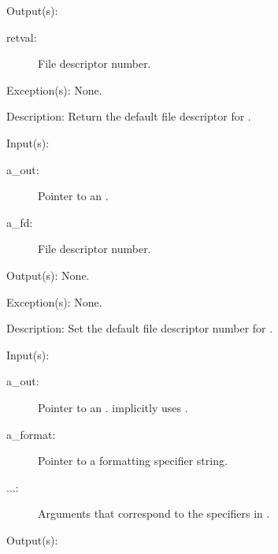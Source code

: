 \begin{capi}
\begin{capilist}
\begin{description}
		\end{description}
	\item[Output(s): ]
		\begin{description}\item[]
		\item[retval: ]
			File descriptor number.
		\end{description}
	\item[Exception(s): ] None.
	\item[Description: ]
		Return the default file descriptor for .
	\end{capilist}
\label{out_default_fd_set}
	\begin{capilist}
	\item[Input(s): ]
		\begin{description}\item[]
		\item[a\_out: ]
			Pointer to an .
		\item[a\_fd: ]
			File descriptor number.
		\end{description}
	\item[Output(s): ] None.
	\item[Exception(s): ] None.
	\item[Description: ]
		Set the default file descriptor number for .
	\end{capilist}
\label{out_put}
\label{_cw_out_put}
	\begin{capilist}
	\item[Input(s): ]
		\begin{description}\item[]
		\item[a\_out: ]
			Pointer to an \classname{out}.
			 implicitly uses
			\cvar{out\_std}.
		\item[a\_format: ]
			Pointer to a formatting specifier string.
		\item[...: ]
			Arguments that correspond to the specifiers in
			\cvar{a\_format}.
		\end{description}
	\item[Output(s): ]
		\begin{description}\item[]

\end{description}
\end{capilist}
\end{capi}
